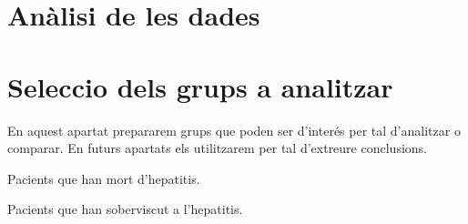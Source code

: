 \documentclass[]{article}
\newenvironment{Shaded}{\begin{snugshade}}{\end{snugshade}}
\newcommand{\CommentTok}[1]{\textcolor[rgb]{0.56,0.35,0.01}{\textit{#1}}}
\newcommand{\ControlFlowTok}[1]{\textcolor[rgb]{0.13,0.29,0.53}{\textbf{#1}}}
\newcommand{\DecValTok}[1]{\textcolor[rgb]{0.00,0.00,0.81}{#1}}
\newcommand{\KeywordTok}[1]{\textcolor[rgb]{0.13,0.29,0.53}{\textbf{#1}}}
\newcommand{\NormalTok}[1]{#1}
\newcommand{\OperatorTok}[1]{\textcolor[rgb]{0.81,0.36,0.00}{\textbf{#1}}}
\newcommand{\StringTok}[1]{\textcolor[rgb]{0.31,0.60,0.02}{#1}}
\begin{document}
\begin{Shaded}
\end{Shaded}

\hypertarget{anuxe0lisi-de-les-dades}{%
\section{Anàlisi de les dades}\label{anuxe0lisi-de-les-dades}}

\hypertarget{seleccio-dels-grups-a-analitzar}{%
\section{Seleccio dels grups a
analitzar}\label{seleccio-dels-grups-a-analitzar}}

En aquest apartat prepararem grups que poden ser d'interés per tal
d'analitzar o comparar. En futurs apartats els utilitzarem per tal
d'extreure conclusions.

Pacients que han mort d'hepatitis.

\begin{Shaded}
\end{Shaded}

Pacients que han soberviscut a l'hepatitis.

\begin{Shaded}
\end{Shaded}
\end{document}
